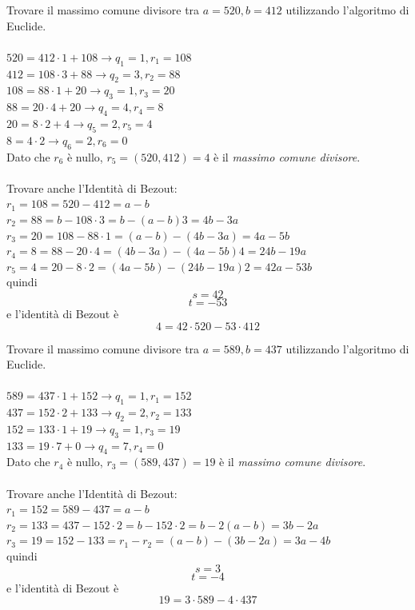 \documentclass[a4paper,12pt, oneside]{book}
\begin{document}
\begin{shaded}
	\begin{esempio}
		Trovare il massimo comune divisore tra $a=520, b=412$ utilizzando l'algoritmo di Euclide.\\\\
		$520 = 412 \cdot 1 + 108 \longrightarrow q_1=1, r_1 = 108$\\
		$412 = 108 \cdot 3 + 88 \longrightarrow q_2=3, r_2 = 88$\\
		$108 = 88 \cdot 1 + 20 \longrightarrow q_3=1, r_3 = 20$\\
		$88 = 20 \cdot 4 + 20 \longrightarrow q_4=4, r_4 = 8$\\
		$20 = 8 \cdot2 + 4 \longrightarrow q_5=2, r_5 = 4$\\
		$8 = 4 \cdot 2 \longrightarrow q_6=2, r_6 = 0$\\
		Dato che $r_6$ è nullo, $r_5 = (520,412) = 4$ è il \textit{massimo comune divisore}.\\\\
		Trovare anche l'Identità di Bezout:\\
		$r_1 = 108 =520 - 412 = a - b$\\
		$r_2 = 88 = b - 108 \cdot 3 = b-(a-b)3 = 4b-3a$\\
		$r_3 = 20 = 108 - 88 \cdot 1 = (a-b) - (4b-3a) = 4a-5b$\\
		$r_4 = 8 = 88-20 \cdot 4 = (4b-3a) - (4a-5b)4 = 24b-19a$\\
		$r_5 = 4 = 20 - 8 \cdot 2 = (4a-5b) - (24b-19a)2 = 42a-53b$\\
		quindi
		$$s = 42$$
		$$t = -53$$
		e l'identità di Bezout è
		$$4 = 42 \cdot 520 - 53 \cdot 412$$
	\end{esempio}
	\begin{esempio}
		Trovare il massimo comune divisore tra $a=589, b=437$ utilizzando l'algoritmo di Euclide.\\\\
		$589 = 437 \cdot 1 + 152 \longrightarrow q_1=1, r_1=152$\\
		$437 = 152 \cdot 2 + 133 \longrightarrow q_2=2, r_2=133$\\
		$152 = 133 \cdot 1 + 19 \longrightarrow q_3=1, r_3=19$\\
		$133 = 19 \cdot 7 + 0 \longrightarrow q_4 = 7, r_4 = 0$\\
		Dato che $r_4$ è nullo, $r_3 = (589,437) = 19$ è il \textit{massimo comune divisore}.\\\\
		Trovare anche l'Identità di Bezout:\\
		$r_1 = 152 = 589 - 437 = a-b$\\
		$r_2 = 133 = 437 - 152 \cdot 2 = b - 152 \cdot 2 = b-2(a-b) = 3b-2a$\\
		$r_3 = 19 = 152-133 = r_1-r_2 = (a-b)-(3b-2a) = 3a-4b$\\
		quindi
		$$s = 3$$ $$t=-4$$
		e l'identità di Bezout è
		$$19 = 3 \cdot 589 - 4 \cdot 437$$
	\end{esempio}
\end{shaded}
\end{document}

